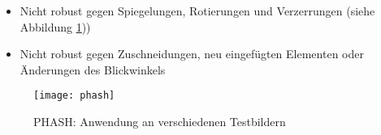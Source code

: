 \begin{itemize}[topsep=0pt]
    \item Nicht robust gegen Spiegelungen, Rotierungen und Verzerrungen (siehe
    Abbildung \ref{fig:phash}))
    \item Nicht robust gegen Zuschneidungen, neu eingefügten Elementen oder
    Änderungen des Blickwinkels
\end{itemize}

\begin{figure}[H]
    \centering
    \texttt{[image: phash]}
    \caption{PHASH: Anwendung an verschiedenen Testbildern}
    \label{fig:phash}
\end{figure}